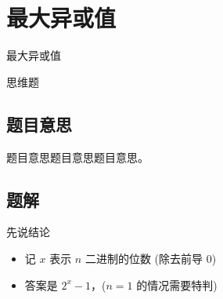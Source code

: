 \def\sectionName{最大异或值}
\section{\sectionName}



\begin{frame}

\isBeamerMode\relax
    {\Huge \sectionName}\par
\fi




思维题



\end{frame}

\subsection{题目意思}
\begin{frame} %
题目意思题目意思题目意思。
\end{frame}



\subsection{题解}
\begin{frame} %
先说结论

\begin{itemize}
    \item 记 $x$ 表示 $n$ 二进制的位数 (除去前导 $0$)
    \item 答案是 $2^x - 1$，($n = 1$ 的情况需要特判)
\end{itemize}

\end{frame}

